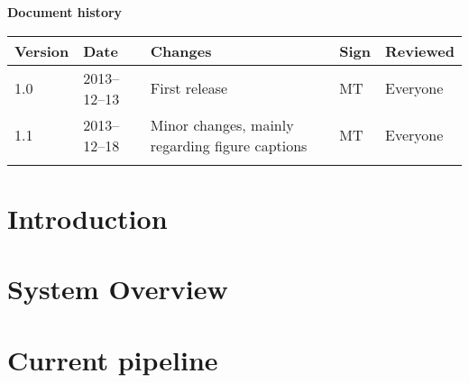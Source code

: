 \documentclass[10pt, a4paper, twoside]{article}
\numberwithin{equation}{subsection}
\numberwithin{figure}{section}
\numberwithin{table}{section}
\begin{document}



\newpage
\pagestyle{fancy}
\setcounter{page}{2} %




\newpage
\tableofcontents
\listoffigures
\listoftables



\newpage
\vspace*{5\baselineskip}

\begin{center}
\textbf{\LARGE Document history}

{ \footnotesize 
\begin{tabular}{|p{1cm}|p{2.0cm}|p{5cm}|p{1.5cm}|p{2cm}|}
	\hline

	\textbf{Version} & \textbf{Date} & \textbf{Changes} & \textbf{Sign} & \textbf{Reviewed} \\
	
	\hline
	1.0 & 2013--12--13 & First release & MT & Everyone\\
	\hline
	1.1 & 2013--12--18 & Minor changes, mainly regarding figure captions & MT & Everyone\\
		
	\hline
	 &  &  &  &  \\
	
	\hline
\end{tabular}
}
\end{center}





%
%
\newpage
{}

\newpage
\section{Introduction}
\label{sec:introduction}


\newpage
\section{System Overview}
\label{sec:system_overview}


\newpage
\section{Current pipeline}
\label{sec:current_pipeline}

\end{document}
